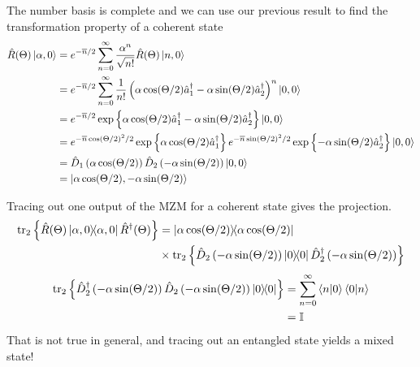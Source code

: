 The number basis is complete and we can use our previous result to find the transformation property of a coherent state
\begin{equation}
	\begin{split}
		\hat{R}(\Theta)
		\ket{\alpha,0}
		&=
		e^{-\overline{n}/2}
		\sum_{n=0}^\infty
		\frac{\alpha^n}{\sqrt{n!}}
		\hat{R}(\Theta)
		\ket{n,0}
		\\
		&=
		e^{-\overline{n}/2}
		\sum_{n=0}^\infty
		\frac{1}{n!}
		\left(
			\alpha
			\cos(\Theta/2)
			\hat{a}_1^\dagger
			-
			\alpha
			\sin(\Theta/2)
			\hat{a}_2^\dagger
		\right)^n
		\ket{0,0}
		\\
		&=
		e^{-\overline{n}/2}
		\exp\left\{
			\alpha
			\cos(\Theta/2)
			\hat{a}_1^\dagger
			-
			\alpha
			\sin(\Theta/2)
			\hat{a}_2^\dagger
		\right\}
		\ket{0,0}
		\\
		&=
		e^{-\overline{n}\cos(\Theta/2)^2/2}
		\exp\left\{
			\alpha
			\cos(\Theta/2)
			\hat{a}_1^\dagger
		\right\}
		e^{-\overline{n}\sin(\Theta/2)^2/2}
		\exp\left\{
			-
			\alpha
			\sin(\Theta/2)
			\hat{a}_2^\dagger
		\right\}
		\ket{0,0}
		\\
		&=
		\hat{D}_1\left(
			\alpha
			\cos(\Theta/2)
		\right)
		\hat{D}_2\left(
			-
			\alpha
			\sin(\Theta/2)
		\right)
		\ket{0,0}
		\\
		&=
		\ket{\alpha\cos(\Theta/2),-\alpha\sin(\Theta/2)}
	\end{split}
\end{equation}

Tracing out one output of the MZM for a coherent state gives the projection.
\begin{equation}
	\begin{split}
		\tr_2\left\{
			\hat{R}(\Theta)
			\ketbra{\alpha,0}
			\hat{R}^\dagger(\Theta)
		\right\}
		&=
		\ketbra{\alpha\cos(\Theta/2)}
		\\
		&\times
		\tr_2\left\{
			\hat{D}_2\left(
				-
				\alpha
				\sin(\Theta/2)
			\right)
			\ketbra{0}
			\hat{D}_2^\dagger\left(
				-
				\alpha
				\sin(\Theta/2)
			\right)
		\right\}
	\end{split}
\end{equation}
\begin{equation}
	\begin{split}
		\tr_2\left\{
			\hat{D}_2^\dagger\left(
				-
				\alpha
				\sin(\Theta/2)
			\right)
			\hat{D}_2\left(
				-
				\alpha
				\sin(\Theta/2)
			\right)
			\ketbra{0}
		\right\}
		&=
		\sum_{n=0}^\infty
		\braket{n}{0}
		\braket{0}{n}
		\\
		&=
		\mathbb{I}
	\end{split}
\end{equation}
That is not true in general, and tracing out an entangled state yields a mixed state!

